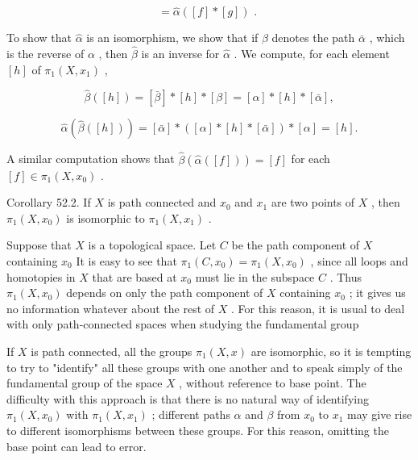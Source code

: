 \[
= \widehat{\alpha }\left( {\left\lbrack  f\right\rbrack   * \left\lbrack  g\right\rbrack  }\right) \text{ . }
\]

To show that \(\widehat{\alpha }\) is an isomorphism, we show that if \(\beta\) denotes the path \(\bar{\alpha }\) , which is the reverse of \(\alpha\) , then \(\widehat{\beta }\) is an inverse for \(\widehat{\alpha }\) . We compute, for each element \(\left\lbrack  h\right\rbrack\) of \({\pi }_{1}\left( {X,{x}_{1}}\right)\) ,

\[
\widehat{\beta }\left( \left\lbrack  h\right\rbrack  \right)  = \left\lbrack  \bar{\beta }\right\rbrack   * \left\lbrack  h\right\rbrack   * \left\lbrack  \beta \right\rbrack   = \left\lbrack  \alpha \right\rbrack   * \left\lbrack  h\right\rbrack   * \left\lbrack  \bar{\alpha }\right\rbrack  ,
\]

\[
\widehat{\alpha }\left( {\widehat{\beta }\left( \left\lbrack  h\right\rbrack  \right) }\right)  = \left\lbrack  \bar{\alpha }\right\rbrack   * \left( {\left\lbrack  \alpha \right\rbrack   * \left\lbrack  h\right\rbrack   * \left\lbrack  \bar{\alpha }\right\rbrack  }\right)  * \left\lbrack  \alpha \right\rbrack   = \left\lbrack  h\right\rbrack  .
\]

A similar computation shows that \(\widehat{\beta }\left( {\widehat{\alpha }\left( \left\lbrack  f\right\rbrack  \right) }\right)  = \left\lbrack  f\right\rbrack\) for each \(\left\lbrack  f\right\rbrack   \in  {\pi }_{1}\left( {X,{x}_{0}}\right)\) .

Corollary 52.2. If \(X\) is path connected and \({x}_{0}\) and \({x}_{1}\) are two points of \(X\) , then \({\pi }_{1}\left( {X,{x}_{0}}\right)\) is isomorphic to \({\pi }_{1}\left( {X,{x}_{1}}\right)\) .

Suppose that \(X\) is a topological space. Let \(C\) be the path component of \(X\) containing \({x}_{0}\) It is easy to see that \({\pi }_{1}\left( {C,{x}_{0}}\right)  = {\pi }_{1}\left( {X,{x}_{0}}\right)\) , since all loops and homotopies in \(X\) that are based at \({x}_{0}\) must lie in the subspace \(C\) . Thus \({\pi }_{1}\left( {X,{x}_{0}}\right)\) depends on only the path component of \(X\) containing \({x}_{0}\) ; it gives us no information whatever about the rest of \(X\) . For this reason, it is usual to deal with only path-connected spaces when studying the fundamental group

If \(X\) is path connected, all the groups \({\pi }_{1}\left( {X,x}\right)\) are isomorphic, so it is tempting to try to "identify" all these groups with one another and to speak simply of the fundamental group of the space \(X\) , without reference to base point. The difficulty with this approach is that there is no natural way of identifying \({\pi }_{1}\left( {X,{x}_{0}}\right)\) with \({\pi }_{1}\left( {X,{x}_{1}}\right)\) ; different paths \(\alpha\) and \(\beta\) from \({x}_{0}\) to \({x}_{1}\) may give rise to different isomorphisms between these groups. For this reason, omitting the base point can lead to error.

